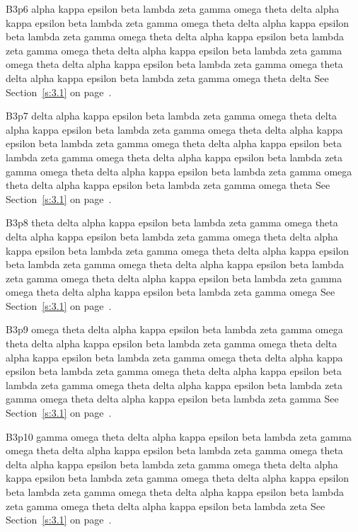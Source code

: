 B3p6 alpha kappa epsilon beta lambda zeta gamma omega theta delta alpha kappa epsilon beta lambda zeta gamma omega theta delta alpha kappa epsilon beta lambda zeta gamma omega theta delta alpha kappa epsilon beta lambda zeta gamma omega theta delta alpha kappa epsilon beta lambda zeta gamma omega theta delta alpha kappa epsilon beta lambda zeta gamma omega theta delta alpha kappa epsilon beta lambda zeta gamma omega theta delta See Section~\ref{s:3.1} on page~\pageref{s:3.1}.

B3p7 delta alpha kappa epsilon beta lambda zeta gamma omega theta delta alpha kappa epsilon beta lambda zeta gamma omega theta delta alpha kappa epsilon beta lambda zeta gamma omega theta delta alpha kappa epsilon beta lambda zeta gamma omega theta delta alpha kappa epsilon beta lambda zeta gamma omega theta delta alpha kappa epsilon beta lambda zeta gamma omega theta delta alpha kappa epsilon beta lambda zeta gamma omega theta See Section~\ref{s:3.1} on page~\pageref{s:3.1}.

B3p8 theta delta alpha kappa epsilon beta lambda zeta gamma omega theta delta alpha kappa epsilon beta lambda zeta gamma omega theta delta alpha kappa epsilon beta lambda zeta gamma omega theta delta alpha kappa epsilon beta lambda zeta gamma omega theta delta alpha kappa epsilon beta lambda zeta gamma omega theta delta alpha kappa epsilon beta lambda zeta gamma omega theta delta alpha kappa epsilon beta lambda zeta gamma omega See Section~\ref{s:3.1} on page~\pageref{s:3.1}.

B3p9 omega theta delta alpha kappa epsilon beta lambda zeta gamma omega theta delta alpha kappa epsilon beta lambda zeta gamma omega theta delta alpha kappa epsilon beta lambda zeta gamma omega theta delta alpha kappa epsilon beta lambda zeta gamma omega theta delta alpha kappa epsilon beta lambda zeta gamma omega theta delta alpha kappa epsilon beta lambda zeta gamma omega theta delta alpha kappa epsilon beta lambda zeta gamma See Section~\ref{s:3.1} on page~\pageref{s:3.1}.

B3p10 gamma omega theta delta alpha kappa epsilon beta lambda zeta gamma omega theta delta alpha kappa epsilon beta lambda zeta gamma omega theta delta alpha kappa epsilon beta lambda zeta gamma omega theta delta alpha kappa epsilon beta lambda zeta gamma omega theta delta alpha kappa epsilon beta lambda zeta gamma omega theta delta alpha kappa epsilon beta lambda zeta gamma omega theta delta alpha kappa epsilon beta lambda zeta See Section~\ref{s:3.1} on page~\pageref{s:3.1}.

